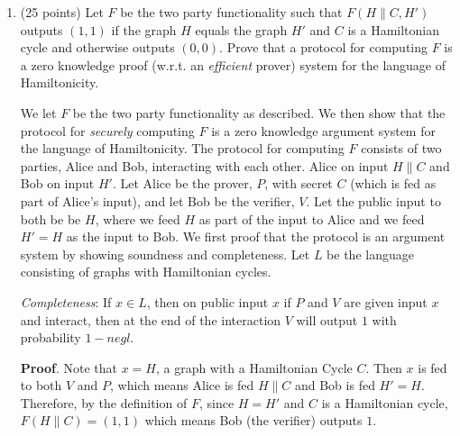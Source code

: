 \documentclass{article}
\begin{document}
\begin{enumerate}%

\item{}
(25 points) Let $F$ be the two party functionality such that $F(H\|C,H')$ outputs $(1,1)$ if the graph $H$ equals the graph $H'$ and $C$ is a Hamiltonian cycle and otherwise outputs $(0,0)$. Prove that a protocol for computing $F$ is a zero knowledge proof (w.r.t. an \emph{efficient} prover) system for the language of Hamiltonicity.%

\noindent{}We let $F$ be the two party functionality as described. We then show that the protocol for \emph{securely}
computing $F$ is a zero knowledge argument system for the language of Hamiltonicity. The protocol
for computing $F$ consists of two parties, Alice and Bob, interacting with each other. Alice
on input $H\|C$ and Bob on input $H'$. Let Alice be the prover, $P$, with secret $C$ (which is fed
as part of Alice's input), and let Bob be the verifier, $V$. Let the public input to both be 
be $H$, where we feed $H$ as part of the input to Alice and we feed $H' = H$ as the input to Bob.
We first proof that the protocol is an argument system by showing soundness and completeness. Let
$L$ be the language consisting of graphs with Hamiltonian cycles.%

\emph{Completeness}: If $x \in L$, then on public input $x$ if $P$ and $V$ are given input $x$ and interact, then at the
end of the interaction $V$ will output $1$ with probability $1-negl$.%

\begin{mdbmarginx}{1ex}{0pt}{1ex}{0pt}%
\noindent{}\textbf{Proof}.  Note that $x = H$, a graph with a Hamiltonian Cycle $C$. Then $x$ is fed to both $V$ and $P$,
which means Alice is fed $H \| C$ and Bob is fed $H' = H$. Therefore, by the definition of $F$,
since $H = H'$ and $C$ is a Hamiltonian cycle, $F(H\| C) = (1,1)$ which means Bob (the verifier)
outputs $1$.
\mdfloatright{\ensuremath{\Box}}%
\end{mdbmarginx}%


\end{enumerate}
\end{document}
